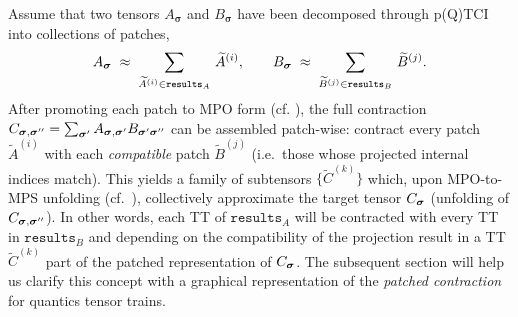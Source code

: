 Assume that two tensors \(A_{\boldsymbol{\sigma}}\) and
\(B_{\boldsymbol{\sigma}}\) have been decomposed through p(Q)TCI into collections of
patches,
\begin{equation}
    \label{eq:patchCollectionsContr}
  A_{\boldsymbol{\sigma}}
    \;\approx\;
    \sum_{\widetilde{A}^{(i)}\in\texttt{results}_{A}}\,
        \widetilde{A}^{(i)},
  \qquad
  B_{\boldsymbol{\sigma}}
    \;\approx\;
    \sum_{\widetilde{B}^{(j)}\in\texttt{results}_{B}}\,
        \widetilde{B}^{(j)}.
\end{equation}
After promoting each patch to MPO form (cf. ), the full contraction \(C_{\boldsymbol{\sigma},\boldsymbol{\sigma}''} = \sum_{\boldsymbol{\sigma}'}A_{\boldsymbol{\sigma},\boldsymbol{\sigma}'}B_{\boldsymbol{\sigma}'\boldsymbol{\sigma}''}\) can be assembled patch-wise:
contract every patch \(\widetilde{A}^{(i)}\) with each \emph{compatible} patch \(\widetilde{B}^{(j)}\) (i.e.\ those whose projected internal indices match).  This yields a family of subtensors \(\{\widetilde{C}^{(k)}\}\) which, upon MPO-to-MPS unfolding (cf.\ ), collectively approximate the target tensor \(C_{\boldsymbol{\sigma}}\) (unfolding of $C_{\boldsymbol{\sigma},\boldsymbol{\sigma}''}$). In other words, each TT of $\texttt{results}_{A}$ will be contracted with every TT in $\texttt{results}_{B}$ and depending on the compatibility of the projection result in a TT $\widetilde{C}^{(k)}$ part of the patched representation of \(C_{\boldsymbol{\sigma}}\). The subsequent section will help us clarify this concept with a graphical representation of the \textit{patched contraction} for quantics tensor trains.

